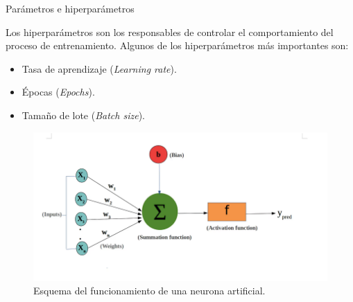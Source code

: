 \begin{frame}{Parámetros e hiperparámetros}

	
	 Los hiperparámetros son los responsables de controlar el comportamiento del proceso de entrenamiento. Algunos de los hiperparámetros más importantes son:
\begin{itemize}
	\item Tasa de aprendizaje (\textit{Learning rate}).
	\item Épocas (\textit{Epochs}).
	\item Tamaño de lote (\textit{Batch size}).
\end{itemize}

    \begin{figure}
    \centering
		    \includegraphics[width=0.75\linewidth]{../Memoria/img/modelo/neuronaartificial.png}
		    \caption{Esquema del funcionamiento de una neurona artificial.}
		    \label{fig:neu-art}
    \end{figure}

\end{frame}



